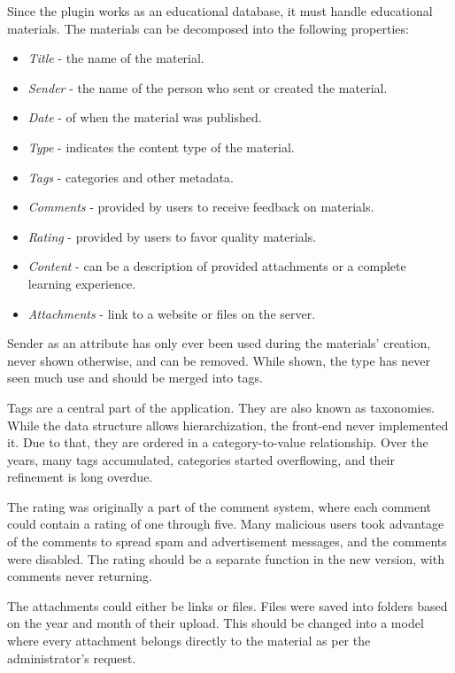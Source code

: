 \documentclass[
  digital,     %
  oneside,     %
  nosansbold,  %
  colorbold, %
  lof,         %
  lot,         %
]{fithesis4}
\begin{document}
Since the plugin works as an educational database, it must handle educational materials. The
materials can be decomposed into the following properties: \begin{itemize}
	\item \textit{Title} - the name of the material.
	\item \textit{Sender} - the name of the person who sent or created the material.
	\item \textit{Date} - of when the material was published.
	\item \textit{Type} - indicates the content type of the material.
	\item \textit{Tags} - categories and other metadata.
	\item \textit{Comments} - provided by users to receive feedback on materials.
	\item \textit{Rating} - provided by users to favor quality materials.
	\item \textit{Content} - can be a description of provided attachments or a complete
	learning experience.
	\item \textit{Attachments} - link to a website or files on the server.
\end{itemize}

Sender as an attribute has only ever been used during the materials' creation, never shown
otherwise, and can be removed. While shown, the type has never seen much use and should be
merged into tags.

Tags are a central part of the application. They are also known as taxonomies. While the data
structure allows hierarchization, the front-end never implemented it. Due to that, they are ordered in
a category-to-value relationship. Over the years, many tags accumulated, categories started
overflowing, and their refinement is long overdue.

The rating was originally a part of the comment system, where each comment could contain a rating
of one through five. Many malicious users took advantage of the comments to spread spam and
advertisement messages, and the comments were disabled. The rating should be a separate function
in the new version, with comments never returning.

The attachments could either be links or files. Files were saved into folders based on the year and
month of their upload. This should be changed into a model where every attachment belongs directly
to the material as per the administrator's request.

\newpage
\end{document}
